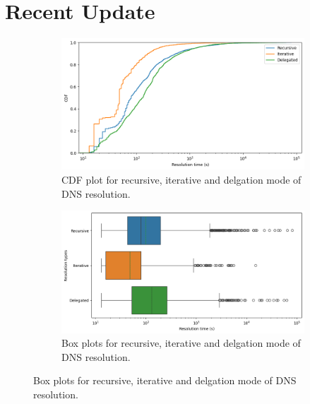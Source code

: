 \documentclass{article}
\begin{document}
\section{Recent Update}
\begin{figure}[htpb]
    \centering
    \begin{subfigure}[b]{0.48\linewidth}
        \includegraphics[width=\linewidth]{plots/rec-iter-del-cdf.png}
        \vspace{-7mm}
        \caption{CDF plot for recursive, iterative and delgation mode of DNS resolution.}
        \vspace{-3mm}
        \label{fig:records-box}
    \end{subfigure}
    \hfill
    \begin{subfigure}[b]{0.48\linewidth}
        \includegraphics[width=\linewidth]{plots/rec-iter-del-boxplot.png}
        \vspace{-7mm}
        \caption{Box plots for recursive, iterative and delgation mode of DNS resolution.}
        \vspace{-3mm}
        \label{fig:records-boxen}
    \end{subfigure}
\end{figure}
\end{document}

